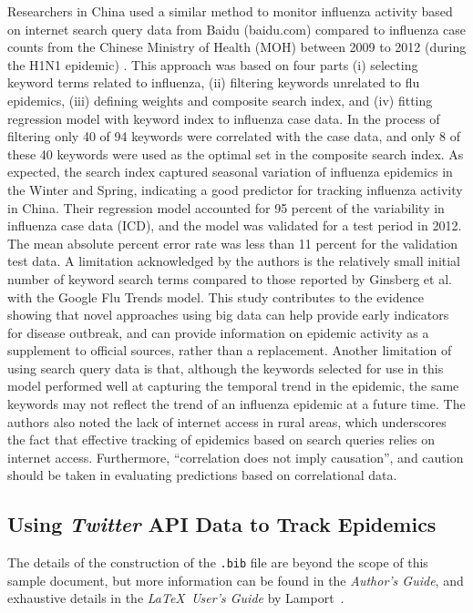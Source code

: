 \documentclass[sigconf]{acmart}
\begin{document}
Researchers in China used a similar method to monitor influenza activity based 
on internet search query data from Baidu (baidu.com) compared to influenza case 
counts from the Chinese Ministry of Health (MOH) between 2009 to 2012 (during the 
H1N1 epidemic) \cite{yuan13}. This approach was based on four parts (i) selecting 
keyword terms related to influenza, (ii) filtering keywords unrelated to flu 
epidemics, (iii) defining weights and composite search index, and (iv) fitting 
regression model with keyword index to influenza case data. In the process of 
filtering only 40 of 94 keywords were correlated with the case data, and only 8 
of these 40 keywords were used as the optimal set in the composite search index. 
As expected, the search index captured seasonal variation of influenza epidemics in 
the Winter and Spring, indicating a good predictor for tracking influenza activity
in China.  Their regression model accounted for 95 percent of the variability in 
influenza case data (ICD), and the model was validated for a test period in 2012. 
The mean absolute percent error rate was less than 11 percent for the validation 
test data. A limitation acknowledged by the authors is the relatively small initial 
number of keyword search terms compared to those reported by Ginsberg et al. with 
the Google Flu Trends model. This study contributes to the evidence showing that novel 
approaches using big data can help provide early indicators for disease outbreak, 
and can provide information on epidemic activity as a supplement to official sources, 
rather than a replacement. Another limitation of using search query data is that, 
although the keywords selected for use in this model performed well at capturing 
the temporal trend in the epidemic, the same keywords may not reflect the trend of 
an influenza epidemic at a future time. The authors also noted the lack of internet 
access in rural areas, which underscores the fact that effective tracking of epidemics 
based on search queries relies on internet access. Furthermore, “correlation does 
not imply causation”, and caution should be taken in evaluating predictions based 
on correlational data.    

\subsection{Using {\itshape Twitter} API Data to Track Epidemics}

The details of the construction of the \texttt{.bib} file are beyond
the scope of this sample document, but more information can be found
in the \textit{Author's Guide}, and exhaustive details in the
\textit{\LaTeX\ User's Guide} by Lamport~.
\end{document}
